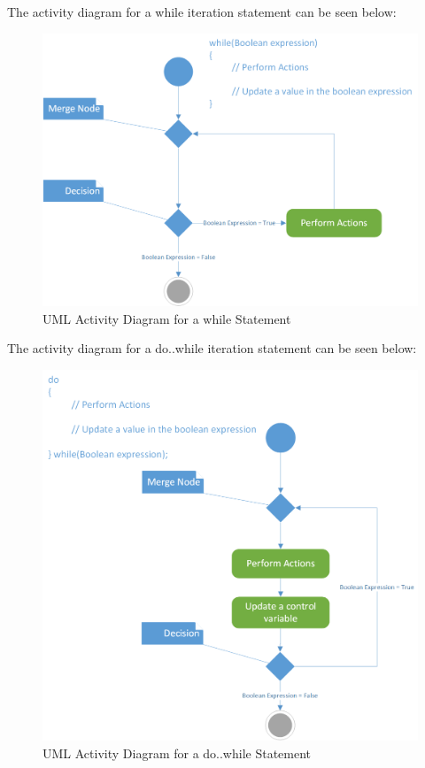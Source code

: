 \documentclass[
]{book}
\begin{document}
The activity diagram for a while iteration statement can be seen below:

\begin{figure}

{\centering \includegraphics[width=1\linewidth]{images/while} 

}

\caption{UML Activity Diagram for a while Statement}\label{fig:unnamed-chunk-11}
\end{figure}

The activity diagram for a do..while iteration statement can be seen below:

\begin{figure}

{\centering \includegraphics[width=1\linewidth]{images/do_while} 

}

\caption{UML Activity Diagram for a do..while Statement}\label{fig:unnamed-chunk-12}
\end{figure}
\end{document}
